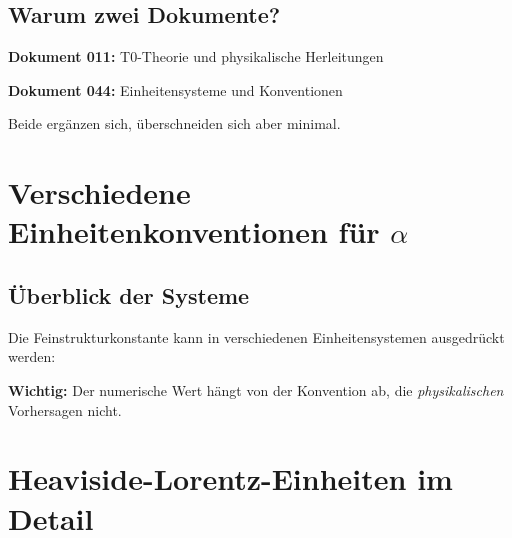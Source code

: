 	\subsection{Warum zwei Dokumente?}
	
	\textbf{Dokument 011:} T0-Theorie und physikalische Herleitungen
	
	\textbf{Dokument 044:} Einheitensysteme und Konventionen
	
	Beide ergänzen sich, überschneiden sich aber minimal.
	
	\section{Verschiedene Einheitenkonventionen für $\alpha$}
	
	\subsection{Überblick der Systeme}
	
	Die Feinstrukturkonstante kann in verschiedenen Einheitensystemen ausgedrückt werden:
	
	\begin{table}[h]
		\centering
		\caption{Einheitensysteme für $\alpha$}
	\end{table}
	
	\textbf{Wichtig:} Der numerische Wert hängt von der Konvention ab, die \textit{physikalischen} Vorhersagen nicht.
	
	\section[Heaviside-Lorentz-Einheiten im Detail]{Heaviside-Lorentz-Einheiten im Detail}
	
